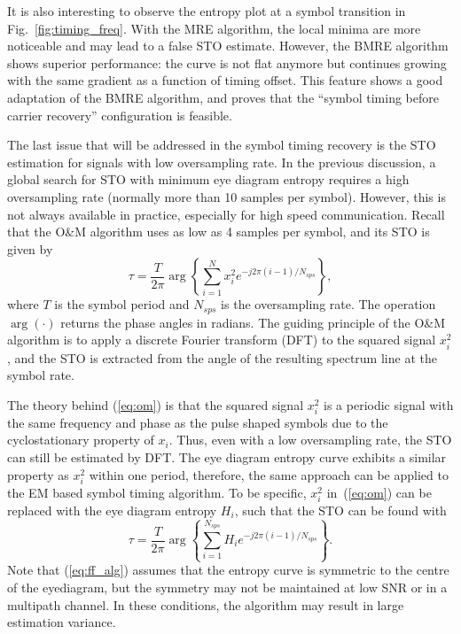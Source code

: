 \documentclass[12pt, draftclsnofoot, onecolumn]{IEEEtran}
\begin{document}
It is also interesting to observe the entropy plot at a symbol transition in Fig.~\ref{fig:timing_freq}.
With the MRE algorithm, the local minima are more noticeable and may lead to a false STO estimate.
However, the BMRE algorithm shows superior performance:
the curve is not flat anymore but continues growing with the same gradient as a function of timing offset.
This feature shows a good adaptation of the BMRE algorithm, and proves that the ``symbol timing before carrier recovery'' configuration is feasible.


The last issue that will be addressed in the symbol timing recovery is the STO estimation for signals with low oversampling rate.
In the previous discussion, a global search for STO with minimum eye diagram entropy requires a high oversampling rate (normally more than 10 samples per symbol).
However, this is not always available in practice, especially for high speed communication.
Recall that 
the O\&M algorithm uses as low as 4 samples per symbol, and its STO is given by
\begin{equation}
\tau=\frac{T}{2\pi}\arg \left\{ {\sum\limits_{i = 1}^{N} {x_i^2{e^{ - j2\pi (i-1)/N_{sps}}}} } \right\},
\label{eq:om}
\end{equation}
where \(T\) is the symbol period and \(N_{sps}\) is the oversampling rate.
The operation \(\arg( \cdot )\) returns the phase angles in radians.
The guiding principle of the O\&M algorithm is to apply a discrete Fourier transform (DFT) to the squared signal \(x_i^2\),
and the STO is extracted from the angle of the resulting spectrum line at the symbol rate.

The theory behind (\ref{eq:om}) is that the squared signal \(x_i^2\) is a periodic signal with the same frequency and phase as the pulse shaped symbols due to the cyclostationary property of \(x_i\).
Thus, even with a low oversampling rate, the STO can still be estimated by DFT.
The eye diagram entropy curve exhibits a similar property as \(x_i^2\) within one period,
therefore, the same approach can be applied to the EM based symbol timing algorithm.
% 
% 
To be specific, \(x_i^2\) in~(\ref{eq:om}) can be replaced  with the eye diagram entropy \(H_i\), 
such that the STO can be found with
\begin{equation}
\tau  = \frac{T}{{2\pi }}\arg \left\{ {\sum\limits_{i = 1}^{N_{sps}} {H_i{e^{ - j2\pi (i-1)/N_{sps}}}} } \right\}.
\label{eq:ff_alg}
\end{equation}
Note that (\ref{eq:ff_alg}) assumes that the entropy curve is symmetric to the centre of the eyediagram,
but the symmetry may not be maintained at low SNR or in a multipath channel.
In these conditions, the algorithm may result in large estimation variance.
\end{document}
